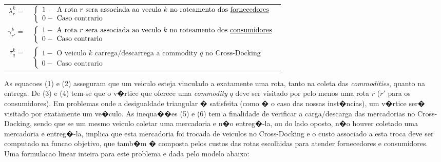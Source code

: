 \documentclass[12pt]{article}
\begin{document}
\begin{table}[!htb]
\begin{tabular}{rl}
\vspace{1mm}
$\lambda^k_r = $ &
$\left\{
\begin{array} {l}
1 - \textrm{ A rota } r \textrm{ sera associada ao veculo } k \textrm{ no roteamento dos \underline{fornecedores}} \\
0 - \textrm{ Caso contrario}
\end{array} \right.
$
\\
\vspace{2mm}
$\gamma^k_{r'} = $ &
$\left\{
\begin{array} {l}
1 - \textrm{ A rota } r \textrm{ sera associada ao veculo } k \textrm{ no roteamento dos \underline{consumidores}} \\
0 - \textrm{ Caso contrario}
\end{array} \right.
$
\\
\vspace{1mm}
$\tau^k_q = $ &
$\left\{
\begin{array} {l}
1 - \textrm{ O veiculo } k \textrm{ carrega/descarrega a commodity } q \textrm{ no Cross-Docking}\\
0 - \textrm{ Caso contrario } 
\end{array} \right.
$
\end{tabular}
\end{table}

\noindent As equacoes (1) e (2) asseguram que um veiculo esteja vinculado a exatamente uma rota, tanto na coleta das \textit{commodities}, quanto na entrega. De (3) e (4) tem-se que o v�rtice que oferece uma \textit{commodity} $q$ deve ser visitado por pelo menos uma rota $r$ ($r'$ para os consumidores). Em problemas onde a desigualdade triangular � satisfeita (como � o caso das nossas inst�ncias), um v�rtice ser� visitado por exatamente um ve�culo. As inequa��es (5) e (6) tem a finalidade de verificar a carga/descarga das mercadorias no Cross-Docking, sendo que se um mesmo veiculo coletar uma mercadoria e n�o entreg�-la, ou do lado oposto, n�o houver coletado uma mercadoria e entreg�-la, implica que esta mercadoria foi trocada de veiculos no Cross-Docking e o custo associado a esta troca deve ser computado na funcao objetivo, que tamb�m � composta pelos custos das rotas escolhidas para atender fornecedores e consumidores.\\

\newpage
\noindent Uma formulacao linear inteira para este problema e dada pelo modelo abaixo:
\end{document}

